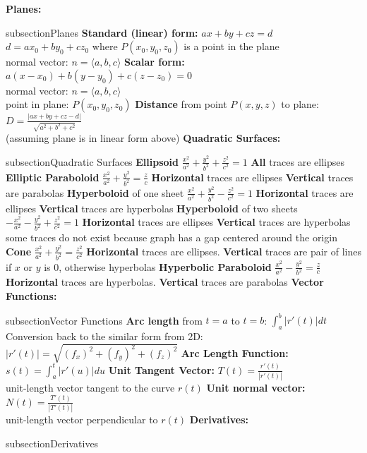 \documentclass{article}
\newcommand{\upspace}{\vspace{0px}}
\newcommand{\zzz}[1]{\0 {\textbf{#1:}} \addcontentsline{toc} {subsection}{#1}}
\newcommand{\aaa}{\upspace \1}
\newcommand{\bbb}{\upspace \2}
\begin{document}
\begin{multicols*}{2}
\begin{outline}[compactitem]
\zzz{Planes}
	\aaa \textbf{Standard (linear) form:} $ax + by + cz = d$
	\\ $d = ax_0 + by_0 + cz_0 $ where $P(x_0,y_0,z_0)$ is a point in the plane
	\\ normal vector: $n = \langle a,b,c \rangle$
	\aaa \textbf{Scalar form:} $a(x-x_0) + b(y-y_0) + c(z-z_0) = 0$
	\\ normal vector: $n = \langle a,b,c \rangle$
	\\ point in plane: $P(x_0,y_0,z_0)$
	\aaa \textbf{Distance} from point $P(x,y,z)$ to plane: $D = \frac{|ax + by + cz - d|}{\sqrt{a^2 + b^2 + c^2}}$
	\\ (assuming plane is in linear form above)
\zzz{Quadratic Surfaces}
	\aaa \textbf{Ellipsoid}                    \dotfill $\frac{x^2}{a^2} + \frac{y^2}{b^2} + \frac{z^2}{c^2} = 1$
		\bbb \textbf{All} traces are ellipses
	\aaa \textbf{Elliptic Paraboloid}          \dotfill $\frac{x^2}{a^2} + \frac{y^2}{b^2} = \frac{z}{c}$
		\bbb \textbf{Horizontal} traces are ellipses
		\bbb \textbf{Vertical}   traces are parabolas
	\aaa \textbf{Hyperboloid} of one sheet     \dotfill $\frac{x^2}{a^2} + \frac{y^2}{b^2} - \frac{z^2}{c^2} = 1$
		\bbb \textbf{Horizontal} traces are ellipses
		\bbb \textbf{Vertical}   traces are hyperbolas
	\aaa \textbf{Hyperboloid} of two sheets    \dotfill $ -\frac{x^2}{a^2} - \frac{y^2}{b^2} + \frac{z^2}{c^2} = 1$
		\bbb \textbf{Horizontal} traces are ellipses
		\bbb \textbf{Vertical}   traces are hyperbolas
		\bbb some traces do not exist because graph has a gap centered around the origin
	\aaa \textbf{Cone}                         \dotfill $\frac{x^2}{a^2} + \frac{y^2}{b^2} = \frac{z^2}{c^2}$
		\bbb \textbf{Horizontal} traces are ellipses.
		\bbb \textbf{Vertical}   traces are pair of lines if $x$ or $y$ is 0, otherwise hyperbolas
	\aaa \textbf{Hyperbolic Paraboloid}        \dotfill $\frac{x^2}{a^2} - \frac{y^2}{b^2} = \frac{z}{c}$
		\bbb \textbf{Horizontal} traces are hyperbolas.
		\bbb \textbf{Vertical}   traces are parabolas
\zzz{Vector Functions}
	\aaa \textbf{Arc length} from $t=a$ to $t=b$: $\int_a^b |r'(t)| dt$
		\bbb Conversion back to the similar form from 2D:
		\bbb $|r'(t)| = \sqrt{(f_x)^2 + (f_y)^2 + (f_z)^2}$
	\aaa \textbf{Arc Length Function:} $s(t) = \int_a^t |r'(u)| du$
	\aaa \textbf{Unit Tangent Vector:} $T(t) = \frac{r'(t)}{|r'(t)|}$
	\\ unit-length vector tangent to the curve $r(t)$
	\aaa \textbf{Unit normal vector:} $N(t) = \frac{T'(t)}{|T'(t)|}$
	\\ unit-length vector perpendicular to $r(t)$
\zzz{Derivatives}

\end{outline}
\end{multicols*}
\end{document}
